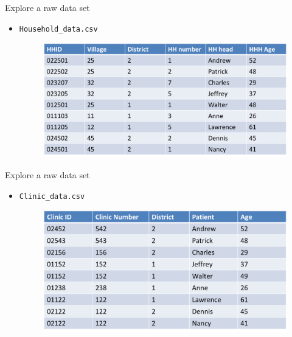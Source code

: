 \documentclass[aspectratio=169]{beamer}
\begin{document}
\begin{frame}{Explore a raw data set}
	\begin{itemize}
		\item \texttt{Household\_data.csv}
		\begin{figure}
			\centering
			\includegraphics[width=\linewidth]{img/raw1}
		\end{figure}
	\end{itemize}
\end{frame}



\begin{frame}{Explore a raw data set}
	\begin{itemize}
		\item \texttt{Clinic\_data.csv}
		\begin{figure}
			\centering
			\includegraphics[width=\linewidth]{img/raw2}
		\end{figure}
	\end{itemize}
\end{frame}
\end{document}

